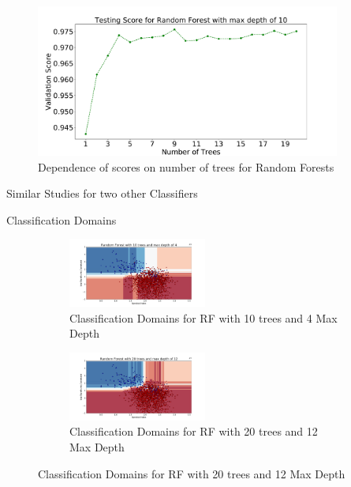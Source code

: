 \documentclass{beamer}
\begin{document}
\begin{frame}
\begin{figure}[!h]
    \centering
    \includegraphics[height=5cm,width=8 cm]{treesvsscore_RF_10seeds_10maxdepth}
    \caption{Dependence of scores on number of trees for Random Forests}
    \label{fig:mot4}
\end{figure}
Similar Studies for two other Classifiers 
\end{frame}

\begin{frame}{Classification Domains}
\begin{figure}[!h]
\centering
	\begin{subfigure}[b]{\linewidth}
    		\centering
    		\includegraphics[width=0.5\textwidth]{classification_domains(rf_10trees_4maxdepth_weightbalanced_oobscoretrue)}
    		\caption{Classification Domains for RF with 10 trees and 4 Max Depth}
    		\label{fig:mot3}
	\end{subfigure}
	
	\begin{subfigure}[b]{\linewidth}
    		\centering
    		\includegraphics[width=0.5\textwidth]{classification_domains(rf_20trees_12maxdepth_weightbalanced_oobscoretrue)}
    		\caption{Classification Domains for RF with 20 trees and 12 Max Depth}
    		\label{fig:mot2}
	\end{subfigure}
\end{figure}
\end{frame}
\end{document}
